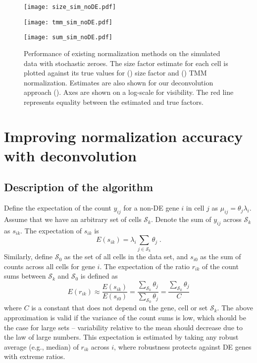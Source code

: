 \documentclass{article}
\begin{document}
\begin{figure}[tb]
\begin{minipage}{0.33\textwidth}
\texttt{[image: size\_sim\_noDE.pdf]}
\subcaption{}\label{subfig:size_noDE}
\end{minipage}
\begin{minipage}{0.33\textwidth}
\texttt{[image: tmm\_sim\_noDE.pdf]}
\subcaption{}\label{subfig:tmm_noDE}
\end{minipage}
\begin{minipage}{0.33\textwidth}
\texttt{[image: sum\_sim\_noDE.pdf]}
\subcaption{}\label{subfig:sum_noDE}
\end{minipage}
\caption{
    Performance of existing normalization methods on the simulated data with stochastic zeroes.
    The size factor estimate for each cell is plotted against its true values for () size factor and () TMM normalization.
    Estimates are also shown for our deconvolution approach ().
    Axes are shown on a log-scale for visibility.
    The red line represents equality between the estimated and true factors.
}
\label{fig:existing_noDE}
\end{figure}

\section{Improving normalization accuracy with deconvolution}

\subsection{Description of the algorithm}
Define the expectation of the count $y_{ij}$ for a non-DE gene $i$ in cell $j$ as $\mu_{ij} = \theta_j\lambda_i$.
Assume that we have an arbitrary set of cells $\mathcal{S}_k$.
Denote the sum of $y_{ij}$ across $\mathcal{S}_k$ as $s_{ik}$.
The expectation of $s_{ik}$ is
\[
    E(s_{ik}) = \lambda_i \sum_{j \in \mathcal{S}_k} \theta_j \;.
\]
Similarly, define $\mathcal{S}_0$ as the set of all cells in the data set, and $s_{i0}$ as the sum of counts across all cells for gene $i$.
The expectation of the ratio $r_{ik}$ of the count sums between $\mathcal{S}_k$ and $\mathcal{S}_0$ is defined as
\begin{equation}
    E(r_{ik}) \approx \frac{E(s_{ik})}{E(s_{i0})} = \frac{\sum_{\mathcal{S}_k} \theta_j}{\sum_{\mathcal{S}_0} \theta_j} = \frac{\sum_{\mathcal{S}_k} \theta_j}{C}
    \label{eqn:linear_single}
\end{equation}
where $C$ is a constant that does not depend on the gene, cell or set $\mathcal{S}_k$.
The above approximation is valid if the variance of the count sums is low, which should be the case for large sets 
    -- variability relative to the mean should decrease due to the law of large numbers.
This expectation is estimated by taking any robust average (e.g., median) of $r_{ik}$ across $i$, where robustness protects against DE genes with extreme ratios.
\end{document}
